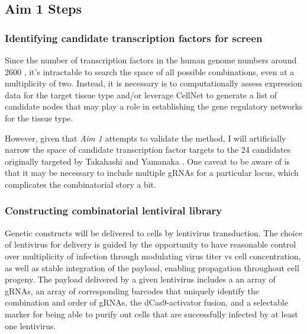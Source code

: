 \documentclass[10pt]{article}
\begin{document}
\subsection{Aim 1 Steps}

\subsubsection{Identifying candidate transcription factors for screen}

Since the number of transcription factors in the human genome numbers around 2600 \cite{babu2004structure}, it's intractable to search the space of all possible combinations, even at a multiplicity of two. Instead, it is necessary is to computationally assess expression data for the target tissue type and/or leverage CellNet \cite{cahan2014cellnet} to generate a list of candidate nodes that may play a role in establishing the gene regulatory networks for the tissue type.

However, given that \textit{Aim 1} attempts to validate the method, I will artificially narrow the space of candidate transcription factor targets to the 24 candidates originally targeted by Takahashi and Yamanaka \cite{takahashi2006induction}. One caveat to be aware of is that it may be necessary to include multiple gRNAs for a particular locus, which complicates the combinatorial story a bit.

\subsubsection{Constructing combinatorial lentiviral library}

Genetic constructs will be delivered to cells by lentivirus transduction. The choice of lentivirus for delivery is guided by the opportunity to have reasonable control over multiplicity of infection through modulating virus titer vs cell concentration, as well as stable integration of the payload, enabling propagation throughout cell progeny. The payload delivered by a given lentivirus includes a an array of gRNAs, an array of corresponding barcodes that uniquely identify the combination and order of gRNAs, the dCas9-activator fusion, and a selectable marker for being able to purify out cells that are successfully infected by at least one lentivirus.
\end{document}
